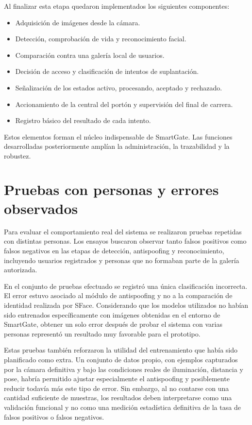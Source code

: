 Al finalizar esta etapa quedaron implementados los siguientes componentes:

\begin{itemize}
    \item Adquisición de imágenes desde la cámara.
    \item Detección, comprobación de vida y reconocimiento facial.
    \item Comparación contra una galería local de usuarios.
    \item Decisión de acceso y clasificación de intentos de suplantación.
    \item Señalización de los estados activo, procesando, aceptado y rechazado.
    \item Accionamiento de la central del portón y supervisión del final de carrera.
    \item Registro básico del resultado de cada intento.
\end{itemize}

Estos elementos forman el núcleo indispensable de SmartGate. Las funciones desarrolladas posteriormente amplían la administración, la trazabilidad y la robustez.

\section{Pruebas con personas y errores observados}

Para evaluar el comportamiento real del sistema se realizaron pruebas repetidas con distintas personas. Los ensayos buscaron observar tanto falsos positivos como falsos negativos en las etapas de detección, antispoofing y reconocimiento, incluyendo usuarios registrados y personas que no formaban parte de la galería autorizada.

En el conjunto de pruebas efectuado se registró una única clasificación incorrecta. El error estuvo asociado al módulo de antispoofing y no a la comparación de identidad realizada por SFace. Considerando que los modelos utilizados no habían sido entrenados específicamente con imágenes obtenidas en el entorno de SmartGate, obtener un solo error después de probar el sistema con varias personas representó un resultado muy favorable para el prototipo.

Estas pruebas también reforzaron la utilidad del entrenamiento que había sido planificado como extra. Un conjunto de datos propio, con ejemplos capturados por la cámara definitiva y bajo las condiciones reales de iluminación, distancia y pose, habría permitido ajustar especialmente el antispoofing y posiblemente reducir todavía más este tipo de error. Sin embargo, al no contarse con una cantidad suficiente de muestras, los resultados deben interpretarse como una validación funcional y no como una medición estadística definitiva de la tasa de falsos positivos o falsos negativos.

